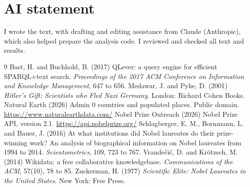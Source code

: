 \documentclass[11pt,a4paper]{article}
\begin{document}
\section*{AI statement}
I wrote the text, with drafting and editing assistance from Claude (Anthropic), which also helped prepare the analysis code. I reviewed and checked all text and results.

\begin{thebibliography}{9}
 Bast, H. and Buchhold, B. (2017) QLever: a query engine for efficient SPARQL+text search. \emph{Proceedings of the 2017 ACM Conference on Information and Knowledge Management}, 647 to 656.
 Medawar, J. and Pyke, D. (2001) \emph{Hitler's Gift: Scientists who Fled Nazi Germany}. London: Richard Cohen Books.
 Natural Earth (2026) Admin 0 countries and populated places. Public domain. \url{https://www.naturalearthdata.com/}
 Nobel Prize Outreach (2026) Nobel Prize API, version 2.1. \url{https://api.nobelprize.org/}
 Schlagberger, E. M., Bornmann, L. and Bauer, J. (2016) At what institutions did Nobel laureates do their prize-winning work? An analysis of biographical information on Nobel laureates from 1994 to 2014. \emph{Scientometrics}, 109, 723 to 767.
 Vrandečić, D. and Krötzsch, M. (2014) Wikidata: a free collaborative knowledgebase. \emph{Communications of the ACM}, 57(10), 78 to 85.
 Zuckerman, H. (1977) \emph{Scientific Elite: Nobel Laureates in the United States}. New York: Free Press.
\end{thebibliography}
\end{document}
